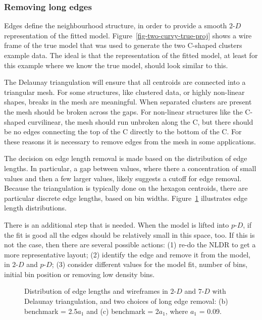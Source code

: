 \documentclass[
  12pt]{article}
\newcommand\pD{$p\text{-}D$}
\newcommand\gD{$2\text{-}D$}
\begin{document}
\subsubsection{Removing long edges}\label{removing-long-edges}

Edges define the neighbourhood structure, in order to provide a smooth
\gD{} representation of the fitted model.
Figure~\ref{fig-two-curvy-true-proj} shows a wire frame of the true
model that was used to generate the two C-shaped clusters example data.
The ideal is that the representation of the fitted model, at least for
this example where we know the true model, should look similar to this.

The Delaunay triangulation will ensure that all centroids are connected
into a triangular mesh. For some structures, like clustered data, or
highly non-linear shapes, breaks in the mesh are meaningful. When
separated clusters are present the mesh should be broken across the
gaps. For non-linear structures like the C-shaped curvilinear, the mesh
should run unbroken along the C, but there should be no edges connecting
the top of the C directly to the bottom of the C. For these reasons it
is necessary to remove edges from the mesh in some applications.

The decision on edge length removal is made based on the distribution of
edge lengths. In particular, a gap between values, where there a
concentration of small values and then a few larger values, likely
suggests a cutoff for edge removal. Because the triangulation is
typically done on the hexagon centroids, there are particular discrete
edge lengths, based on bin widths. Figure~\ref{fig-rm-lg} illustrates
edge length distributions.

There is an additional step that is needed. When the model is lifted
into \pD{}, if the fit is good all the edges should be relatively small
in this space, too. If this is not the case, then there are several
possible actions: (1) re-do the NLDR to get a more representative
layout; (2) identify the edge and remove it from the model, in \gD{} and
\pD{}; (3) consider different values for the model fit, number of bins,
initial bin position or removing low density bins.

\begin{figure}


\caption{\label{fig-rm-lg}Distribution of edge lengths and wireframes in
\gD{} and \(7\text{-}D\) with Delaunay triangulation, and two choices of
long edge removal: (b) benchmark = 2.5\(a_1\) and (c) benchmark =
2\(a_1\), where \(a_1\) = 0.09.}

\end{figure}%
\end{document}
